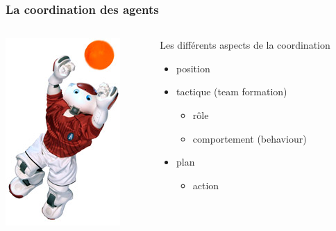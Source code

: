 \documentclass{beamer}
\begin{document}
\begin{frame}
\frametitle{La coordination des agents}
\begin{columns}
    \begin{column}{0.3\textwidth}
        \begin{center}
                \includegraphics[width=.90\linewidth]{images/nao3}
        \end{center}
    \end{column}
    \begin{column}{0.6\textwidth}
        Les différents aspects de la coordination
        \begin{itemize}
            \item position
            \item tactique (team formation)
            \begin{itemize}
                \item rôle
                \item comportement (behaviour)
            \end{itemize}
            \item plan
            \begin{itemize}
                \item action
            \end{itemize}
        \end{itemize}
    \end{column}
\end{columns}
\end{frame}
\end{document}
